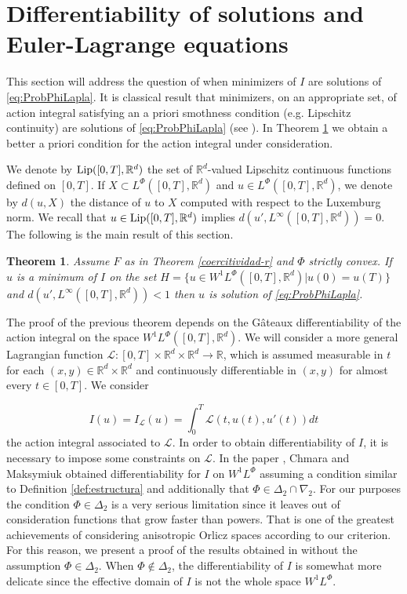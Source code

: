 \documentclass[twoside]{article}
\newtheorem{thm}{Theorem}[section]
\theoremstyle{remark}
\newcommand{\lphi}{L^{\Phi}}
\newcommand{\wphi}{W^{1}\lphi}
\newcommand{\rr}{\mathbb{R}}
\newcommand{\lip}{\mathop{\rm Lip}}
\begin{document}
\section{Differentiability of solutions and Euler-Lagrange equations}\label{sec:diferenciabilidad}


This section will address the question of when minimizers of $I$ are solutions of \eqref{eq:ProbPhiLapla}. It is classical result that minimizers, on an appropriate set, of action integral satisfying an a priori smothness condition (e.g. Lipschitz continuity) are solutions of \eqref{eq:ProbPhiLapla} (see \cite{buttazzo1998one}).  In Theorem \ref{th:tor_prin} we obtain a better a priori condition for the action integral under consideration.

We denote by $\lip([0,T],\rr^d)$ the set of $\rr^d$-valued Lipschitz continuous functions defined on $[0,T]$. If $X\subset \lphi([0,T],\rr^d)$ and $u\in \lphi([0,T],\rr^d)$,  we denote by $d(u,X)$ the distance of $u$ to $X$ computed with respect  to the Luxemburg norm. We recall that  $u\in\lip([0,T],\rr^d)$ implies  $d(u',L^{\infty}([0,T],\rr^d))=0$. The following is the main result of this section.




\begin{thm}\label{th:tor_prin} Assume   $F$ as in Theorem \ref{coercitividad-r} and $\Phi$  strictly convex. If $u$ is a minimum of $I$ on the set $H=\{u\in\wphi([0,T],\rr^d)| u(0)=u(T)\}$ and $d(u',L^{\infty}([0,T],\rr^d))<1$ then $u$ is solution of \eqref{eq:ProbPhiLapla}. 
\end{thm}


The proof of the previous theorem depends on the G\^ateaux differentiability of the action integral on the space $\wphi([0,T],\rr^d)$. We will consider a more general Lagrangian function $\mathcal{L}:[0,T]\times\rr^d\times\rr^d\to\rr$, which  is assumed  measurable in $t$ for each $(x,y)\in \rr^d\times\rr^d$ and  continuously differentiable in $(x,y)$ for almost every $t \in [0,T]$. We consider 

\begin{equation}\label{eq:integral_accion_gen} I(u)=I_{\mathcal{L}}(u)=\int_0^T\mathcal{L}(t,u(t),u'(t))dt\tag{$IG$}
\end{equation}
 the action integral associated to $\mathcal{L}$. In order to obtain differentiability of $I$, it is necessary to impose some constraints on $\mathcal{L}$. In the paper \cite{chamra2017anisotropic}, Chmara and Maksymiuk  obtained differentiability for $I$ on $\wphi$ assuming  a condition  similar to Definition \ref{def:estructura} and additionally that $\Phi\in\Delta_2\cap\nabla_2$. For our purposes the condition $\Phi\in\Delta_2$ is a very serious limitation     since it leaves out of consideration functions that grow faster than powers. That is one of the greatest achievements of considering anisotropic Orlicz spaces according to our criterion.  For this reason, we present a proof  of the results obtained in \cite{chamra2017anisotropic} without the assumption $\Phi\in\Delta_2$. When $\Phi\notin\Delta_2$, the  differentiability of $I$ is somewhat more delicate since the effective domain of $I$ is not the whole space $\wphi$. 
\end{document}
